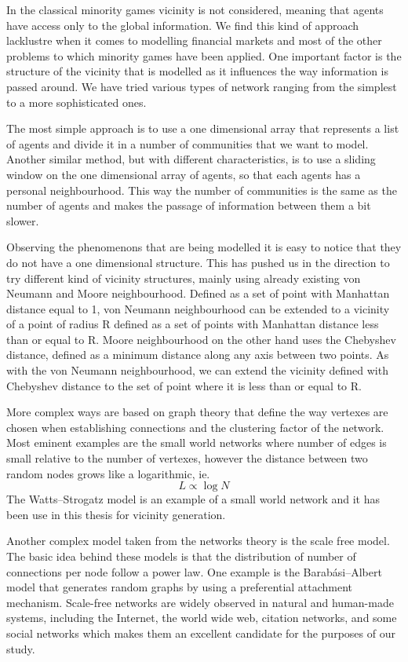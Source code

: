 In the classical minority games vicinity is not considered, meaning that agents have access only to the global information.
We find this kind of approach lacklustre when it comes to modelling financial markets and most of the other problems to which minority games have been applied.
One important factor is the structure of the vicinity that is modelled as it influences the way information is passed around.
We have tried various types of network ranging from the simplest to a more sophisticated ones.

The most simple approach is to use a one dimensional array that represents a list of agents and divide it in a number of communities that we want to model.
Another similar method, but with different characteristics, is to use a sliding window on the one dimensional array of agents, so that each agents has a personal neighbourhood.
This way the number of communities is the same as the number of agents and makes the passage of information between them a bit slower.

Observing the phenomenons that are being modelled it is easy to notice that they do not have a one dimensional structure.
This has pushed us in the direction to try different kind of vicinity structures, mainly using already existing von Neumann and Moore neighbourhood.
Defined as a set of point with Manhattan distance equal to 1, von Neumann neighbourhood can be extended to a vicinity of a point of radius R defined as a set of points with Manhattan distance less than or equal to R.
Moore neighbourhood on the other hand uses the Chebyshev distance, defined as a minimum distance along any axis between two points.
As with the von Neumann neighbourhood, we can extend the vicinity defined with Chebyshev distance to the set of point where it is less than or equal to R.

More complex ways are based on graph theory that define the way vertexes are chosen when establishing connections and the clustering factor of the network.
Most eminent examples are the small world networks where number of edges is small relative to the number of vertexes, however the distance between two random nodes grows like a logarithmic, ie.
\begin{displaymath}
L\propto \log N
\end{displaymath}
The Watts–Strogatz model is an example of a small world network and it has been use in this thesis for vicinity generation.

Another complex model taken from the networks theory is the scale free model. 
The basic idea behind these models is that the distribution of number of connections per node follow a power law.
One example is the Barabási–Albert model that generates random graphs by using a preferential attachment mechanism.
Scale-free networks are widely observed in natural and human-made systems, including the Internet, the world wide web, citation networks, and some social networks which makes them an excellent candidate for the purposes of our study.

